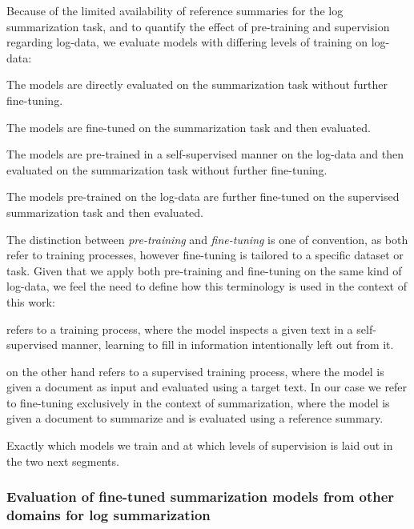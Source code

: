 Because of the limited availability of reference summaries for the log summarization task,
and to quantify the effect of pre-training and supervision regarding log-data,
we evaluate models with differing levels of training on log-data:
\begin{description}[parsep=0pt]
\item[\acf{zsl}]
      The models are directly evaluated on the summarization task without further fine-tuning.
\item[\acf{fsl}]
      The models are fine-tuned on the summarization task and then evaluated.
\item[\acf{prezsl}]
      The models are pre-trained in a self-supervised manner on the log-data
      and then evaluated on the summarization task without further fine-tuning.
\item[\acf{prefsl}]
      The models pre-trained on the log-data are further fine-tuned on the supervised summarization task and then evaluated.
\end{description}
The distinction between \emph{pre-training} and \emph{fine-tuning} is one of convention,
as both refer to training processes, however fine-tuning is tailored to a specific dataset or task.
Given that we apply both pre-training and fine-tuning on the same kind of log-data,
we feel the need to define how this terminology is used in the context of this work:
\begin{description}[nosep]
\item[Pre-training] refers to a training process,
      where the model inspects a given text in a self-supervised manner,
      learning to fill in information intentionally left out from it.
\item[Fine-tuning] on the other hand refers to a supervised training process,
      where the model is given a document as input and evaluated using a target text.
      In our case we refer to fine-tuning exclusively in the context of summarization,
      where the model is given a document to summarize and is evaluated using a reference summary.
\end{description}

Exactly which models we train and at which levels of supervision is laid out in the two next segments.

\subsubsection{Evaluation of fine-tuned summarization models from other domains for log summarization}\label{subsubsec:approch_experiment_1}

